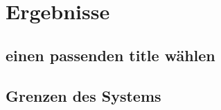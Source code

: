 \section{Ergebnisse}
    \subsection{einen passenden title wählen}
    \subsection{Grenzen des Systems}
